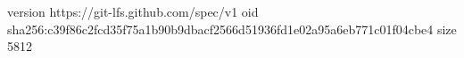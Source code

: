 version https://git-lfs.github.com/spec/v1
oid sha256:c39f86c2fcd35f75a1b90b9dbacf2566d51936fd1e02a95a6eb771c01f04cbe4
size 5812
